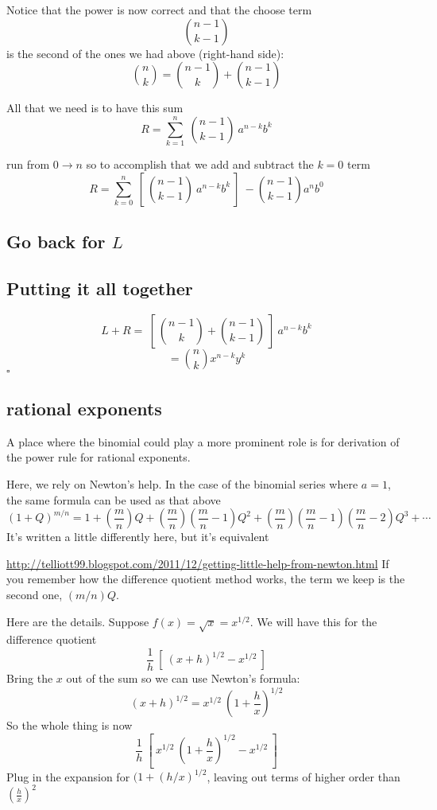 \documentclass[11pt, oneside]{article}   	%
\begin{document}
Notice that the power is now correct and that the choose term
\[ {n-1 \choose k-1} \]
 is the second of the ones we had above (right-hand side):
\[  {{n}\choose{k}} = {{n-1}\choose{k}} + {{n-1}\choose{k-1}} \]

All that we need is to have this sum
\[ R = \sum_{k=1}^{n} \ {n-1 \choose k-1} \ a^{n-k}b^{k} \]

 run from $0 \to n$ so to accomplish that we add and subtract the $k=0$ term
\[ R = \sum_{k=0}^{n} \ [ \ {n-1 \choose k-1} \ a^{n-k}b^{k} \ ] \  - {n-1 \choose k -1}a^nb^0 \]

\subsection*{Go back for $L$}
\subsection*{Putting it all together}
\[ L + R = \ [ \ {n-1 \choose k} + {n-1 \choose k-1} \ ] \ a^{n-k}b^k \]
\[ = {n \choose k}x^{n-k}y^k \]
$\square$

\subsection*{rational exponents}
A place where the binomial could play a more prominent role is for derivation of the power rule for rational exponents.

Here, we rely on Newton's help.  In the case of the binomial series where $a=1$, the same formula can be used as that above
\[ (1 + Q)^{m/n} = 1 + (\frac{m}{n})Q + (\frac{m}{n})(\frac{m}{n}-1)Q^2 + (\frac{m}{n})(\frac{m}{n}-1)(\frac{m}{n}-2)Q^3 + \cdots \]
It's written a little differently here, but it's equivalent
\vspace{2 mm}

\url{http://telliott99.blogspot.com/2011/12/getting-little-help-from-newton.html}
If you remember how the difference quotient method works, the term we keep is the second one, $(m/n)Q$.

Here are the details.  Suppose $f(x) = \sqrt{x} = x^{1/2}$.  We will have this for the difference quotient
\[ \frac{1}{h} \ [ \ (x + h)^{1/2} - x^{1/2} \ ] \]
Bring the $x$ out of the sum so we can use Newton's formula:
\[ (x + h)^{1/2} =  x^{1/2} \ (1 + \frac{h}{x})^{1/2} \]
So the whole thing is now
\[ \frac{1}{h} \ [ \ x^{1/2} \ (1 + \frac{h}{x})^{1/2} - x^{1/2} \ ] \]
Plug in the expansion for $(1 + (h/x)^{1/2}$, leaving out terms of higher order than $(\frac{h}{x})^2$
\end{document}
